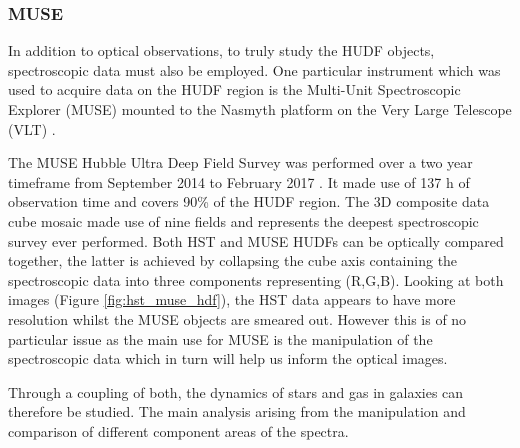 \documentclass[12pt, twocolumn]{revtex4}    %
\begin{document}


\subsubsection{MUSE}

In addition to optical observations, to truly study the HUDF objects, spectroscopic data must also be employed. One particular instrument which was used to acquire data on the HUDF region is the Multi-Unit Spectroscopic Explorer (MUSE) mounted to the Nasmyth platform on the Very Large Telescope (VLT) \cite{bacon_muse_proposal}. 


The MUSE Hubble Ultra Deep Field Survey was performed over a two year timeframe from September 2014 to February 2017 \cite{bacon_muse_hudf}. It made use of 137 h of observation time and covers 90\% of the HUDF region. The 3D composite data cube mosaic made use of nine fields and represents the deepest spectroscopic survey ever performed. Both HST and MUSE HUDFs can be optically compared together, the latter is achieved by collapsing the cube axis containing the spectroscopic data into three components representing (R,G,B). Looking at both images (Figure \ref{fig:hst_muse_hdf}), the HST data appears to have more resolution whilst the MUSE objects are smeared out. However this is of no particular issue as the main use for MUSE is the manipulation of the spectroscopic data which in turn will help us inform the optical images.




Through a coupling of both, the dynamics of stars and gas in galaxies can therefore be studied. The main analysis arising from the manipulation and comparison of different component areas of the spectra.
\end{document}

